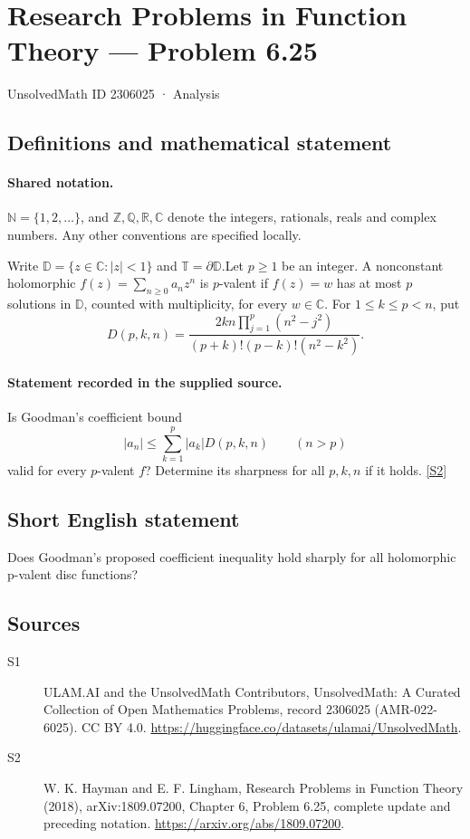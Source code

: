 \documentclass[11pt]{article}
\newcommand{\sref}[2]{\hyperlink{source:#1:#2}{[S#2]}}
\begin{document}
\setcounter{section}{2306024}
\section{Research Problems in Function Theory — Problem 6.25}\label{2306025}
{\small\sffamily UnsolvedMath ID 2306025 · Analysis}
\subsection{Definitions and mathematical statement}

\paragraph{Shared notation.}$\mathbb N=\{1,2,\ldots\}$, and $\mathbb Z,\mathbb Q,\mathbb R,\mathbb C$ denote the integers, rationals, reals and complex numbers. Any other conventions are specified locally.


Write $\mathbb D=\{z\in\mathbb C:|z|<1\}$ and $\mathbb T=\partial\mathbb D$.Let $p\ge1$ be an integer. A nonconstant holomorphic $f(z)=\sum_{n\ge0}a_nz^n$ is $p$-valent if $f(z)=w$ has at most $p$ solutions in $\mathbb D$, counted with multiplicity, for every $w\in\mathbb C$. For $1\le k\le p<n$, put
\[D(p,k,n)=\frac{2kn\prod_{j=1}^p(n^2-j^2)}{(p+k)!(p-k)!(n^2-k^2)}.\]
\paragraph{Statement recorded in the supplied source.}
Is Goodman's coefficient bound
\[|a_n|\le\sum_{k=1}^p|a_k|D(p,k,n)\qquad(n>p)\]
valid for every $p$-valent $f$? Determine its sharpness for all $p,k,n$ if it holds. \sref{2306025}{2}
\subsection{Short English statement}
Does Goodman’s proposed coefficient inequality hold sharply for all holomorphic p-valent disc functions?
\subsection{Sources}
\begin{description}
\item[\hypertarget{source:2306025:1}{S1}] ULAM.AI and the UnsolvedMath Contributors, UnsolvedMath: A Curated Collection of Open Mathematics Problems, record 2306025 (AMR-022-6025). CC BY 4.0. \url{https://huggingface.co/datasets/ulamai/UnsolvedMath}.
\item[\hypertarget{source:2306025:2}{S2}] W. K. Hayman and E. F. Lingham, Research Problems in Function Theory (2018), arXiv:1809.07200, Chapter 6, Problem 6.25, complete update and preceding notation. \url{https://arxiv.org/abs/1809.07200}.
\end{description}
\label{end:2306025}
\end{document}
